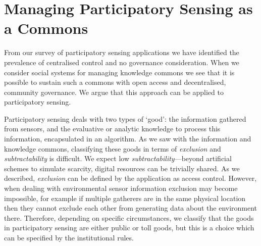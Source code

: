 \section{Managing Participatory Sensing as a Commons}


From our survey of participatory sensing applications we have identified the
prevalence of centralised control and no governance consideration. When we
consider social systems for managing knowledge commons we see that it is
possible to sustain such a commons with open access and decentralised,
community governance. We argue that this approach can be applied to
participatory sensing.

Participatory sensing deals with two types of `good': the information gathered
from sensors, and the evaluative or analytic knowledge to process this
information, encapsulated in an algorithm. As we saw with the information and
knowledge commons, classifying these goods in terms of \emph{exclusion} and
\emph{subtractability} is difficult. We expect low
\emph{subtractability}---beyond artificial schemes to simulate scarcity,
digital resources can be trivially shared. As we described, \emph{exclusion}
can be defined by the application as access control. However, when dealing
with environmental sensor information exclusion may become impossible, for
example if multiple gatherers are in the same physical location then they
cannot exclude each other from generating data about the environment there.
Therefore, depending on specific circumstances, we classify that the goods in
participatory sensing are either public or toll goods, but this is a choice
which can be specified by the institutional rules. %

